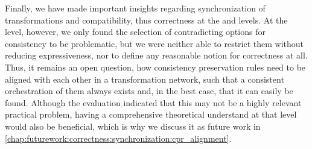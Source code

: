 
Finally, we have made important insights regarding synchronization of transformations and compatibility, thus correctness at the \leveltransformation and \levelnetworkrelation levels.
At the \levelnetworkrule level, however, we only found the selection of contradicting options for consistency to be problematic, but we were neither able to restrict them without reducing expressiveness, nor to define any reasonable notion for correctness at all.
Thus, it remains an open question, how consistency preservation rules need to be aligned with each other in a transformation network, such that a consistent orchestration of them always exists and, in the best case, that it can easily be found.
Although the evaluation indicated that this may not be a highly relevant practical problem, having a comprehensive theoretical understand at that level would also be beneficial, which is why we discuss it as future work in \autoref{chap:futurework:correctness:synchronization:cpr_alignment}.

